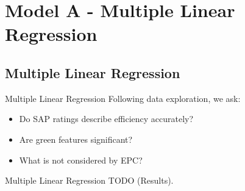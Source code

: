 \section{Model A - Multiple Linear Regression}

\subsection{Multiple Linear Regression}

\begin{frame}{Multiple Linear Regression}
    Following data exploration, we ask:

    \vspace{2.0 em}

    \begin{itemize}
        \setlength\itemsep{16.0pt}
        \item Do SAP ratings describe efficiency accurately?
        \item Are green features significant?
        \item What is not considered by EPC?
    \end{itemize}
\end{frame}

\begin{frame}{Multiple Linear Regression}
    TODO (Results).
\end{frame}